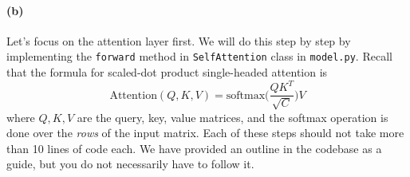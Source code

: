 \documentclass{exam}
\begin{document}
\paragraph{(b)}  Let's focus on the attention layer first. We will do this step by step by implementing the \texttt{forward} method in \texttt{SelfAttention} class in \texttt{model.py}. Recall that the formula for scaled-dot product single-headed attention is 
\begin{equation} 
  \mathrm{Attention}(Q, K, V) = \mathrm{softmax} \bigg( \frac{Q K^T}{\sqrt{C}} \bigg) V
\end{equation} 
where $Q, K, V$ are the query, key, value matrices, and the softmax operation is done over the \textit{rows} of the input matrix. Each of these steps should not take more than 10 lines of code each. We have provided an outline in the codebase as a guide, but you do not necessarily have to follow it. 
\end{document}
